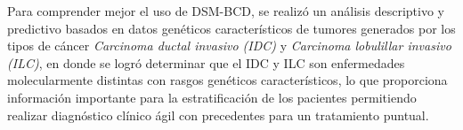 Para comprender mejor el uso de DSM-BCD, se realizó un análisis descriptivo y predictivo basados en datos genéticos característicos de tumores generados por los tipos de cáncer \textit{Carcinoma ductal invasivo (IDC)} y \textit{Carcinoma lobulillar invasivo (ILC)}, en donde se logró determinar que el IDC y ILC son enfermedades molecularmente distintas con rasgos genéticos característicos, lo que proporciona información importante para la estratificación de los pacientes permitiendo realizar diagnóstico clínico ágil con precedentes para un tratamiento puntual.









